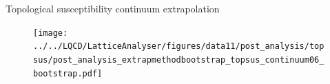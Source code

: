 \documentclass[10pt,show notes on second screen]{beamer}
\begin{document}
\begin{frame}{Topological susceptibility continuum extrapolation}
\begin{figure}
    \centering
    \texttt{[image: ../../LQCD/LatticeAnalyser/figures/data11/post\_analysis/topsus/post\_analysis\_extrapmethodbootstrap\_topsus\_continuum06\_bootstrap.pdf]}
\end{figure}
\end{frame}

\end{document}
